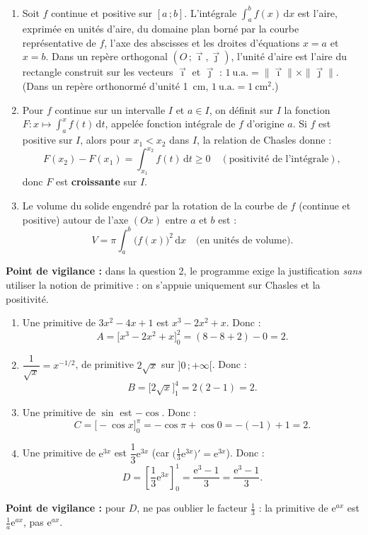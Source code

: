 \documentclass[11pt]{article}
\newcommand{\cle}[1]{{\popxbold\color{popdark}#1}}
\begin{document}
\begin{corrige}
\begin{enumerate}
\item Soit $f$ continue et positive sur $[a\,;b]$. L'intégrale $\displaystyle\int_a^b f(x)\,\mathrm{d}x$ est l'aire, exprimée en unités d'aire, du domaine plan borné par la courbe représentative de $f$, l'axe des abscisses et les droites d'équations $x=a$ et $x=b$. Dans un repère orthogonal $(O\,;\vec{\imath},\vec{\jmath})$, l'\cle{unité d'aire} est l'aire du rectangle construit sur les vecteurs $\vec{\imath}$ et $\vec{\jmath}$ : $1\ \text{u.a.} = \|\vec{\imath}\|\times\|\vec{\jmath}\|$. (Dans un repère orthonormé d'unité \SI{1}{cm}, $1\ \text{u.a.} = 1\ \mathrm{cm}^2$.)
\item Pour $f$ continue sur un intervalle $I$ et $a\in I$, on définit sur $I$ la fonction $F : x\longmapsto \displaystyle\int_a^x f(t)\,\mathrm{d}t$, appelée fonction intégrale de $f$ d'origine $a$. Si $f$ est positive sur $I$, alors pour $x_1 < x_2$ dans $I$, la relation de Chasles donne :
\[
F(x_2)-F(x_1) = \int_{x_1}^{x_2} f(t)\,\mathrm{d}t \ge 0 \quad (\text{positivité de l'intégrale}),
\]
donc $F$ est \textbf{croissante} sur $I$.
\item Le volume du solide engendré par la rotation de la courbe de $f$ (continue et positive) autour de l'axe $(Ox)$ entre $a$ et $b$ est :
\[
V = \pi\int_a^b \big(f(x)\big)^2\,\mathrm{d}x \quad \text{(en unités de volume).}
\]
\end{enumerate}
\textbf{Point de vigilance :} dans la question 2, le programme exige la justification \emph{sans} utiliser la notion de primitive : on s'appuie uniquement sur Chasles et la positivité.
\end{corrige}

\begin{corrige}
\begin{enumerate}
\item Une primitive de $3x^2-4x+1$ est $x^3-2x^2+x$. Donc :
\[
A = \big[x^3-2x^2+x\big]_0^2 = (8-8+2)-0 = \boxed{2}.
\]
\item $\dfrac{1}{\sqrt{x}} = x^{-1/2}$, de primitive $2\sqrt{x}$ sur $]0\,;+\infty[$. Donc :
\[
B = \big[2\sqrt{x}\big]_1^4 = 2(2-1) = \boxed{2}.
\]
\item Une primitive de $\sin$ est $-\cos$. Donc :
\[
C = \big[-\cos x\big]_0^{\pi} = -\cos\pi + \cos 0 = -(-1)+1 = \boxed{2}.
\]
\item Une primitive de $\mathrm{e}^{3x}$ est $\dfrac{1}{3}\mathrm{e}^{3x}$ (car $\big(\frac{1}{3}\mathrm{e}^{3x}\big)' = \mathrm{e}^{3x}$). Donc :
\[
D = \left[\dfrac{1}{3}\mathrm{e}^{3x}\right]_0^1 = \dfrac{\mathrm{e}^3-1}{3} = \boxed{\dfrac{\mathrm{e}^3-1}{3}}.
\]
\end{enumerate}
\textbf{Point de vigilance :} pour $D$, ne pas oublier le facteur $\frac{1}{3}$ : la primitive de $\mathrm{e}^{ax}$ est $\frac{1}{a}\mathrm{e}^{ax}$, pas $\mathrm{e}^{ax}$.
\end{corrige}
\end{document}
